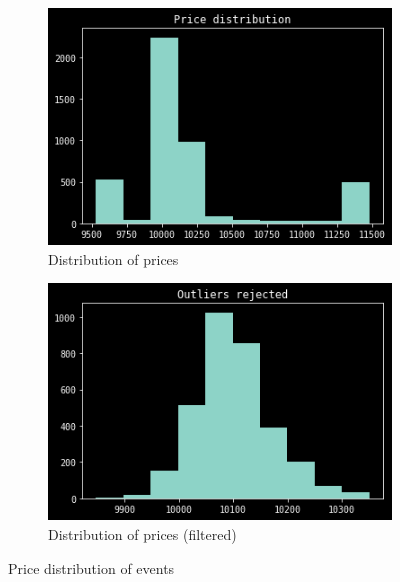 \begin{figure}[H]
    \centering
    \begin{subfigure}[b]{0.45\textwidth}
        \includegraphics[width=\textwidth]{images/ob-price-bars}
        \caption{Distribution of prices}
        \label{fig:ob-price-dist-unfiltered}
    \end{subfigure}
    \begin{subfigure}[b]{0.45\textwidth}
        \includegraphics[width=\textwidth]{images/ob-price-bars-rejected}
        \caption{Distribution of prices (filtered)}
        \label{fig:ob-price-dist-filtered}
    \end{subfigure}
    \caption{Price distribution of events}\label{fig:price-distribution}
\end{figure}

